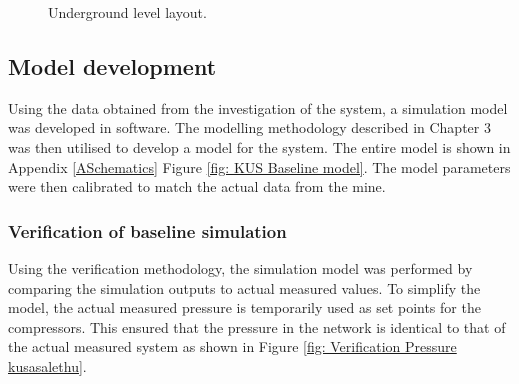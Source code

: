 	\begin{figure}[h!]
		\centering
		\caption{Underground level layout.}
		\label{fig: KUS Underground level layout}
	\end{figure}	
	\subsection{Model development}
	
	Using the data obtained from the investigation of the system, a  simulation model was developed in software. The modelling methodology described in Chapter 3 was then utilised to develop a model for the system. The entire model is shown in Appendix \ref{ASchematics} Figure \ref{fig: KUS Baseline model}. The model parameters were then calibrated to match the actual data from the mine.
	
	\subsubsection{Verification of baseline simulation}
	Using the verification methodology, the simulation model was performed by comparing the simulation outputs to actual measured values. To simplify the model, the actual measured pressure is temporarily used as set points for the compressors. This ensured that the pressure in the network is identical to that of the actual measured system as shown in Figure \ref{fig: Verification Pressure kusasalethu}.
	
	\par 
	
